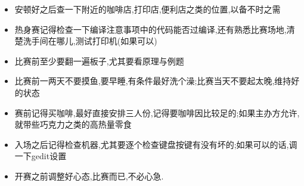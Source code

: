 \noindent
\begin{itemize}
    \item 安顿好之后查一下附近的咖啡店,打印店,便利店之类的位置,以备不时之需
    \item 热身赛记得检查一下编译注意事项中的代码能否过编译,还有熟悉比赛场地,清楚洗手间在哪儿,测试打印机(如果可以)
    \item 比赛前至少要翻一遍板子,尤其要看原理与例题
    \item 比赛前一两天不要摸鱼,要早睡,有条件最好洗个澡;比赛当天不要起太晚,维持好的状态
    \item 赛前记得买咖啡,最好直接安排三人份,记得要咖啡因比较足的;如果主办方允许,就带些巧克力之类的高热量零食
    \item 入场之后记得检查机器,尤其要逐个检查键盘按键有没有坏的;如果可以的话,调一下gedit设置
    \item 开赛之前调整好心态,比赛而已,不必心急.
\end{itemize}